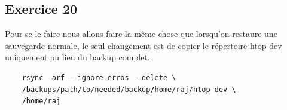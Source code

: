 \documentclass{report}
\begin{document}
\subsection{Exercice 20}
Pour se le faire nous allons faire la même chose que lorsqu'on restaure une sauvegarde normale,
le seul changement est de copier le répertoire htop-dev uniquement au lieu du backup complet.
\begin{tcolorbox}
  \begin{verbatim}
    rsync -arf --ignore-erros --delete \
    /backups/path/to/needed/backup/home/raj/htop-dev \
    /home/raj
  \end{verbatim}
\end{tcolorbox}
\end{document}
